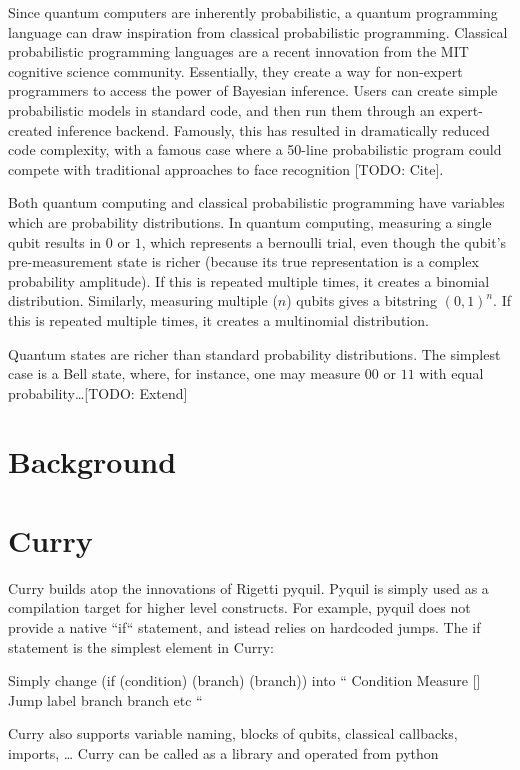 \documentclass[journal]{IEEEtran}
\begin{document}
Since quantum computers are inherently probabilistic, a quantum programming language can draw inspiration from classical probabilistic programming.
Classical probabilistic programming languages are a recent innovation from the MIT cognitive science community. 
Essentially, they create a way for non-expert programmers to access the power of Bayesian inference. 
Users can create simple probabilistic models in standard code, and then run them through an expert-created inference backend.
Famously, this has resulted in dramatically reduced code complexity, with a famous case where a 50-line probabilistic program could compete with traditional approaches to face recognition [TODO: Cite].

Both quantum computing and classical probabilistic programming have variables which are probability distributions.
In quantum computing, measuring a single qubit results in $0$ or $1$, which represents a bernoulli trial, even though the qubit's pre-measurement state is richer (because its true representation is a complex probability amplitude).
If this is repeated multiple times, it creates a binomial distribution.
Similarly, measuring multiple ($n$) qubits gives a bitstring $(0, 1)^n$. 
If this is repeated multiple times, it creates a multinomial distribution.

Quantum states are richer than standard probability distributions.
The simplest case is a Bell state, where, for instance, one may measure $00$ or $11$ with equal probability\dots [TODO: Extend]

\section{Background}

\section{Curry}

Curry builds atop the innovations of Rigetti pyquil.
Pyquil is simply used as a compilation target for higher level constructs.
For example, pyquil does not provide a native ``if`` statement, and istead relies on hardcoded jumps.
The if statement is the simplest element in Curry:

Simply change (if (condition) (branch) (branch))
into
``
Condition
Measure []
Jump label
branch
branch etc
``

Curry also supports variable naming, blocks of qubits, classical callbacks, imports, \dots
Curry can be called as a library and operated from python
\end{document}
